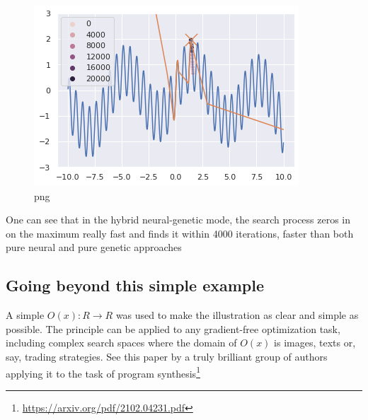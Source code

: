     
\begin{figure}
    \centering
    \includegraphics[width=0.8\linewidth]{images/neuropt4.png}
    \caption{png}
\end{figure}

    

One can see that in the hybrid neural-genetic mode, the search process zeros in on the maximum really fast and finds it within 4000 iterations, faster than both pure neural and pure genetic approaches 

\subsection{Going beyond this simple example}

A simple $ O(x):R \rightarrow R $ was used to make the illustration as clear and simple as possible. The principle can be applied to any gradient-free optimization task, including complex search spaces where the domain of $ O(x) $ is images, texts or, say, trading strategies. See this paper by a truly brilliant group of authors applying it to the task of program synthesis\footnote{\url{https://arxiv.org/pdf/2102.04231.pdf}}
